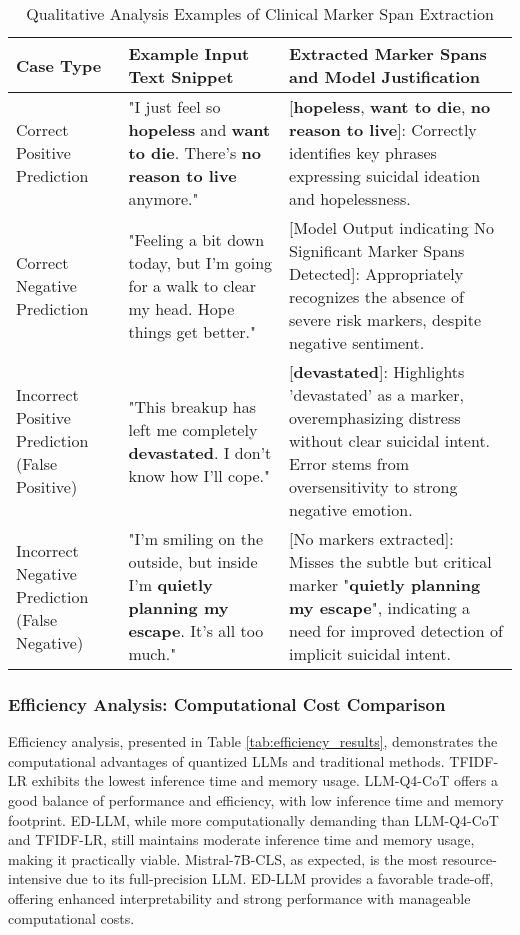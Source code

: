 \begin{table*}[t]
    \centering
    \caption{Qualitative Analysis Examples of Clinical Marker Span Extraction}
    \label{tab:qualitative_examples}
    \begin{tabular}{p{3cm}p{4cm}p{6cm}}
        \toprule
        \textbf{Case Type} & \textbf{Example Input Text Snippet} & \textbf{Extracted Marker Spans and Model Justification} \\
        \midrule
        Correct Positive Prediction & "I just feel so \textbf{hopeless} and \textbf{want to die}. There's \textbf{no reason to live} anymore." & [\textbf{hopeless}, \textbf{want to die}, \textbf{no reason to live}]: Correctly identifies key phrases expressing suicidal ideation and hopelessness. \\
        Correct Negative Prediction & "Feeling a bit down today, but I'm going for a walk to clear my head.  Hope things get better." & [Model Output indicating No Significant Marker Spans Detected]:  Appropriately recognizes the absence of severe risk markers, despite negative sentiment. \\
        Incorrect Positive Prediction (False Positive) & "This breakup has left me completely \textbf{devastated}. I don't know how I'll cope." & [\textbf{devastated}]:  Highlights 'devastated' as a marker, overemphasizing distress without clear suicidal intent. Error stems from oversensitivity to strong negative emotion. \\
        Incorrect Negative Prediction (False Negative) & "I'm smiling on the outside, but inside I'm \textbf{quietly planning my escape}.  It's all too much." & [No markers extracted]: Misses the subtle but critical marker "\textbf{quietly planning my escape}", indicating a need for improved detection of implicit suicidal intent. \\
        \bottomrule
    \end{tabular}
\end{table*}

\subsubsection{Efficiency Analysis: Computational Cost Comparison}

Efficiency analysis, presented in Table \ref{tab:efficiency_results}, demonstrates the computational advantages of quantized LLMs and traditional methods. TFIDF-LR exhibits the lowest inference time and memory usage. LLM-Q4-CoT offers a good balance of performance and efficiency, with low inference time and memory footprint. ED-LLM, while more computationally demanding than LLM-Q4-CoT and TFIDF-LR, still maintains moderate inference time and memory usage, making it practically viable. Mistral-7B-CLS, as expected, is the most resource-intensive due to its full-precision LLM.  ED-LLM provides a favorable trade-off, offering enhanced interpretability and strong performance with manageable computational costs.

